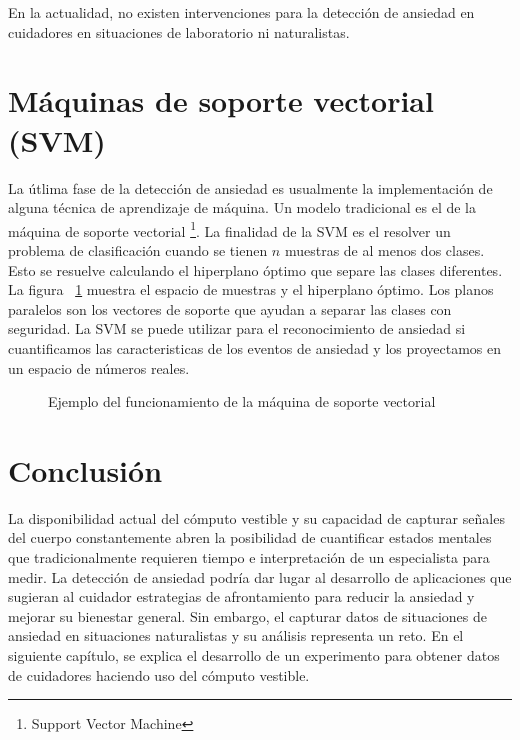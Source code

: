 En la actualidad, no existen intervenciones para la detecci\'on de ansiedad en cuidadores en situaciones de laboratorio ni naturalistas.
\section{M\'aquinas de soporte vectorial (SVM)}
La \'utlima fase de la detecci\'on de ansiedad es usualmente la implementaci\'on de alguna t\'ecnica de aprendizaje de m\'aquina. Un modelo tradicional es el de la m\'aquina de soporte vectorial \footnote{Support Vector Machine}. La finalidad de la SVM es el resolver un problema de clasificaci\'on cuando se tienen $n$ muestras de al menos dos clases. Esto se resuelve calculando el hiperplano \'optimo que separe las clases diferentes. La figura ~\ref{fig:svm} muestra el espacio de muestras y el hiperplano \'optimo. Los planos paralelos son los vectores de soporte que ayudan a separar las clases con seguridad. La SVM se puede utilizar para el reconocimiento de ansiedad si cuantificamos las caracteristicas de los eventos de ansiedad y los proyectamos en un espacio de n\'umeros reales.
\begin{figure}[h]
	\centering
	\caption{Ejemplo del funcionamiento de la m\'aquina de soporte vectorial} \label{fig:svm}
\end{figure}

\section{Conclusi\'on}\label{secc:conclution}
La disponibilidad actual del c\'omputo vestible y su capacidad de capturar se\~nales del cuerpo constantemente abren la posibilidad de cuantificar estados mentales que tradicionalmente requieren tiempo e interpretaci\'on de un especialista para medir. La detecci\'on de ansiedad podr\'ia dar lugar al desarrollo de aplicaciones que sugieran al cuidador estrategias de afrontamiento para reducir la ansiedad y mejorar su bienestar general. Sin embargo, el capturar datos de situaciones de ansiedad en situaciones naturalistas y su an\'alisis representa un reto. En el siguiente cap\'itulo, se explica el desarrollo de un experimento para obtener datos de cuidadores haciendo uso del c\'omputo vestible.
\newpage

